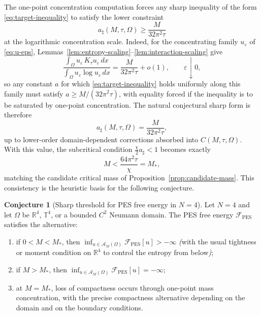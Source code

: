 \documentclass[11pt,reqno]{amsart}
\theoremstyle{definition}
\newtheorem{conjecture}[theorem]{Conjecture}
\theoremstyle{remark}
\newcommand{\R}{\mathbb{R}}
\newcommand{\T}{\mathbb{T}}
\newcommand{\Free}{\mathcal{F}}
\newcommand{\Adm}{\mathcal{A}}
\begin{document}
The one-point concentration computation forces any sharp inequality of the form \eqref{eq:target-inequality} to satisfy the lower constraint
\begin{equation}\label{eq:a-sharp-forced}
        a_{\sharp}(M,\tau,\Omega)\ge\frac{M}{32\pi^{2}\tau}
\end{equation}
at the logarithmic concentration scale. Indeed, for the concentrating family $u_\varepsilon$ of \eqref{eq:u-eps}, Lemmas~\ref{lem:entropy-scaling}--\ref{lem:interaction-scaling} give
\[
        \frac{\int_\Omega u_\varepsilon\,K_\tau u_\varepsilon\,dx}{\int_\Omega u_\varepsilon\log u_\varepsilon\,dx}
        =\frac{M}{32\pi^{2}\tau}+o(1),\qquad \varepsilon\downarrow 0,
\]
so any constant $a$ for which \eqref{eq:target-inequality} holds uniformly along this family must satisfy $a\ge M/(32\pi^{2}\tau)$, with equality forced if the inequality is to be saturated by one-point concentration. The natural conjectural sharp form is therefore
\begin{equation}\label{eq:conjectural-a-sharp}
        a_{\sharp}(M,\tau,\Omega)=\frac{M}{32\pi^{2}\tau},
\end{equation}
up to lower-order domain-dependent corrections absorbed into $C(M,\tau,\Omega)$. With this value, the subcritical condition $\tfrac{\chi}{2}a_{\sharp}<1$ becomes exactly
\[
        M<\frac{64\pi^{2}\tau}{\chi}=M_{\!*},
\]
matching the candidate critical mass of Proposition~\ref{prop:candidate-mass}. This consistency is the heuristic basis for the following conjecture.

\begin{conjecture}[Sharp threshold for PES free energy in $N=4$]\label{conj:sharp-threshold}
Let $N=4$ and let $\Omega$ be $\R^{4}$, $\T^{4}$, or a bounded $C^{2}$ Neumann domain. The PES free energy $\Free_{\mathrm{PES}}$ satisfies the alternative:
\begin{enumerate}[label=(\roman*),leftmargin=2em]
\item if $0<M<M_{\!*}$, then $\inf_{u\in\Adm_M(\Omega)}\Free_{\mathrm{PES}}[u]>-\infty$ \emph{(}with the usual tightness or moment condition on $\R^{4}$ to control the entropy from below\emph{)};
\item if $M>M_{\!*}$, then $\inf_{u\in\Adm_M(\Omega)}\Free_{\mathrm{PES}}[u]=-\infty$;
\item at $M=M_{\!*}$, loss of compactness occurs through one-point mass concentration, with the precise compactness alternative depending on the domain and on the boundary conditions.
\end{enumerate}
\end{conjecture}
\end{document}
